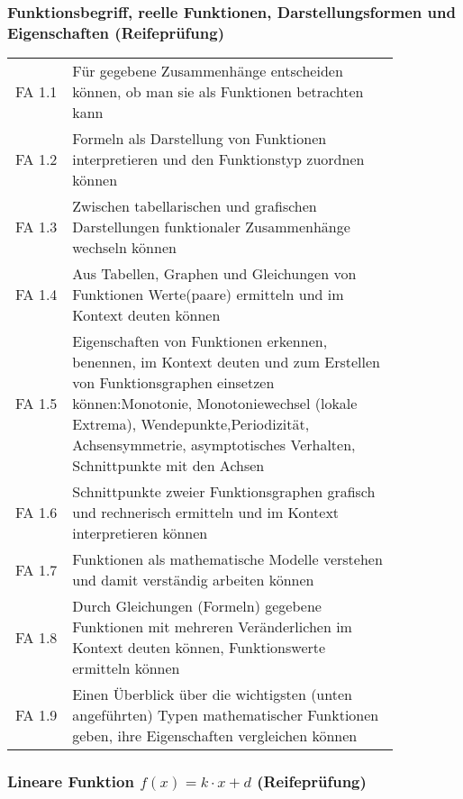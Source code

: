 \documentclass[a4paper,12pt]{article}
\begin{document}
\subsubsection{Funktionsbegriff, reelle Funktionen, Darstellungsformen und Eigenschaften (Reifeprüfung)}

\begin{tabular}{cp{0.85\linewidth}}
FA 1.1 & Für gegebene Zusammenhänge entscheiden können, ob man sie als Funktionen betrachten kann\\
FA 1.2 & Formeln als Darstellung von Funktionen interpretieren und den Funktionstyp zuordnen können \\
FA 1.3 & Zwischen tabellarischen und grafischen Darstellungen funktionaler Zusammenhänge wechseln können \\
FA 1.4 & Aus Tabellen, Graphen und Gleichungen von Funktionen Werte(paare) ermitteln und im Kontext deuten können\\
FA 1.5 & Eigenschaften von Funktionen erkennen, benennen, im Kontext deuten und zum Erstellen von Funktionsgraphen einsetzen können:Monotonie, Monotoniewechsel (lokale Extrema), Wendepunkte,Periodizität, Achsensymmetrie, asymptotisches Verhalten, Schnittpunkte mit den Achsen \\
FA 1.6 & Schnittpunkte zweier Funktionsgraphen grafisch und rechnerisch ermitteln und im Kontext interpretieren können \\
FA 1.7 & Funktionen als mathematische Modelle verstehen und damit verständig arbeiten können \\
FA 1.8 & Durch Gleichungen (Formeln) gegebene Funktionen mit mehreren Veränderlichen im Kontext deuten können, Funktionswerte ermitteln können \\
FA 1.9 & Einen Überblick über die wichtigsten (unten angeführten) Typen mathematischer Funktionen geben, ihre Eigenschaften vergleichen können \\
\end{tabular}


\subsubsection{Lineare Funktion $f(x) = k\cdot x +d$ (Reifeprüfung)}
\end{document}

